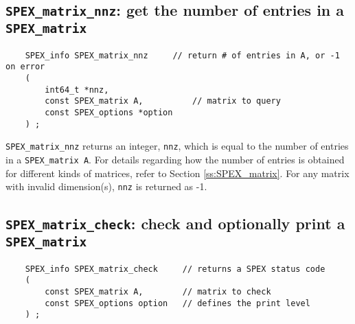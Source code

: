 \documentclass[12pt,oneside]{book}
\theoremstyle{definition}
\begin{document}
\subsection{\texttt{SPEX\_matrix\_nnz}: get the number of entries in a \texttt{SPEX\_matrix}}
\label{s:user:matrix_nnz}
\begin{mdframed}[userdefinedwidth=\textwidth]
{\footnotesize
\begin{verbatim}
    SPEX_info SPEX_matrix_nnz     // return # of entries in A, or -1 on error
    (
        int64_t *nnz,
        const SPEX_matrix A,          // matrix to query
        const SPEX_options *option
    ) ;
\end{verbatim}
} \end{mdframed}

\verb|SPEX_matrix_nnz| returns an integer, \verb|nnz|, which is equal to the number of entries in a \verb|SPEX_matrix A|.
For details regarding how the number of entries is obtained for different kinds
of matrices, refer to Section \ref{ss:SPEX_matrix}.
For any matrix with invalid dimension(s), \verb'nnz' is returned as -1.


\subsection{\texttt{SPEX\_matrix\_check}: check and optionally print a \texttt{SPEX\_matrix}} \label{s:user:matrix_check}
\begin{mdframed}[userdefinedwidth=\textwidth]
{\footnotesize
\begin{verbatim}
    SPEX_info SPEX_matrix_check     // returns a SPEX status code
    (
        const SPEX_matrix A,        // matrix to check
        const SPEX_options option   // defines the print level
    ) ;
\end{verbatim}
} \end{mdframed}
\end{document}
